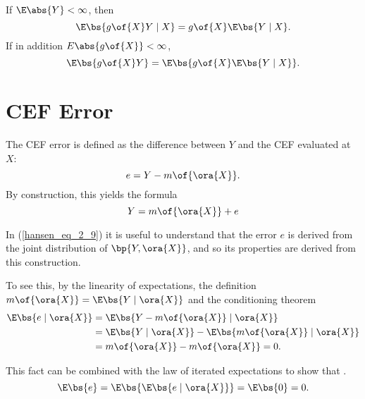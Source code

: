 \begin{theorem} \label{hansen_thm_2_3}
    If  $\E \abs{Y} < \infty$, then 
    \setcounter{equation}{6}
    \begin{equation}
        \label{hansen_eq_2_7}
        \E\bs{g\of{X}Y \mid X} = g\of{X}\E\bs{Y \mid X}.
    \end{equation}
    If in addition $E\abs{g\of{X}}<\infty$,
    \begin{equation}
        \label{hansen_eq_2_8}
        \E\bs{g\of{X}Y} = \E\bs{g\of{X} \E\bs{Y \mid X}}.
    \end{equation}
\end{theorem}

\section{CEF Error}
\setcounter{equation}{8}

The CEF error is defined as the difference between $Y$ and the CEF evaluated at $X$:
$$e = Y - m\of{\ora{X}}.$$
By construction, this yields the formula 
\begin{equation}
    \label{hansen_eq_2_9}
    Y = m\of{\ora{X}} + e
\end{equation}

In (\ref{hansen_eq_2_9}) it is useful to understand that the error $e$ is derived from the joint distribution of $\bp{Y, \ora{X}}$, and so its properties are derived from this construction.

 To see this, by the linearity of expectations, the definition $m\of{\ora{X}} = \E\bs{Y \mid \ora{X}}$ and the conditioning theorem 
\begin{equation}
    \notag
    \begin{aligned}
        \E\bs{e \mid \ora{X}} & = \E\bs{Y - m\of{\ora{X}} \mid \ora{X}} \\ 
        & = \E\bs{Y \mid \ora{X}} - \E\bs{m\of{\ora{X}} \mid \ora{X}} \\ 
        & = m\of{\ora{X}} - m\of{\ora{X}} = 0.
    \end{aligned}
\end{equation}

This fact can be combined with the law of iterated expectations to show that .
\begin{equation}
    \notag
    \E\bs{e} = \E\bs{\E\bs{e \mid \ora{X}}} = \E\bs{0} = 0.
\end{equation}

